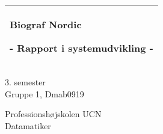 %
\begin{titlepage}
  \addtolength{\hoffset}{0.5\evensidemargin-0.5\oddsidemargin}%
  \noindent%
  \begin{tabular}{@{}p{\textwidth}@{}}
    \toprule[2pt]
    \midrule
    \vspace{0.2cm}
    \begin{center}
    \Huge{\textbf{
      Biograf Nordic %
    }}
    \end{center}
    \begin{center}
      \Large{
        - Rapport i systemudvikling - %
      }
    \end{center}
    \vspace{0.2cm}\\
    \midrule
    \toprule[2pt]
  \end{tabular}
  \vspace{4 cm}
  \begin{center}
    {\large
      3. semester %
    }\\
    \vspace{0.2cm}
    {\Large
      Gruppe 1, Dmab0919 %
    }
  \end{center}
  \vfill
  \begin{center}
  Professionshøjskolen UCN\\
  Datamatiker
  \end{center}
\end{titlepage}
\clearpage